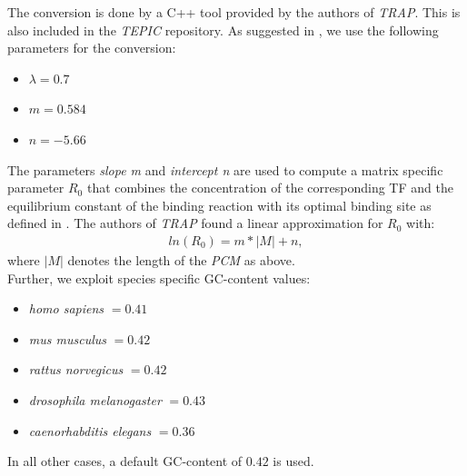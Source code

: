 \documentclass{article}
\begin{document}
The conversion is done by a C++ tool provided by the authors of \textit{TRAP}. This is also included in the \textit{TEPIC} repository.
As suggested in \cite{pmid17098775}, we use the following parameters for the conversion:
\begin{itemize}
\item $\lambda=0.7$
\item $m=0.584$
\item $n=-5.66$
\end{itemize}
The parameters \textit{slope m} and \textit{intercept n} are used to compute a matrix specific parameter $R_0$ that combines the concentration of the corresponding TF and the
equilibrium constant of the binding reaction with its optimal binding site as defined in \cite{pmid17098775}. The authors of \textit{TRAP} found a linear approximation for $R_0$ with:
\begin{align}
ln(R_0)=m*|M|+n,
\end{align}
where $|M|$ denotes the length of the \textit{PCM} as above.
\bigskip
\\Further, we exploit species specific GC-content values:
\begin{itemize}
\item \textit{homo sapiens }$=0.41$
\item \textit{mus musculus }$=0.42$
\item \textit{rattus norvegicus }$=0.42$
\item \textit{drosophila melanogaster }$=0.43$
\item \textit{caenorhabditis elegans }$=0.36$
\end{itemize}
In all other cases, a default GC-content of $0.42$ is used.
\end{document}
